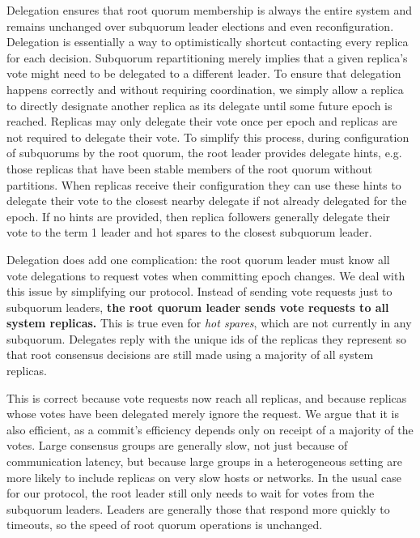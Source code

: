 \documentclass[11pt,conference]{IEEEtran}
\begin{document}
Delegation ensures that root quorum membership is always the entire
system and remains unchanged over subquorum leader elections and even
reconfiguration.
Delegation is essentially a way to optimistically shortcut contacting
every replica for each decision.
Subquorum repartitioning merely implies that a given replica's vote
might need to be delegated to a different leader.
To ensure that delegation happens correctly and without requiring
coordination, we simply allow a replica to directly designate another
replica as its delegate until some future epoch is reached.
Replicas may only delegate their vote once per epoch and replicas are
not required to delegate their vote.
To simplify this process, during configuration of subquorums by the
root quorum, the root leader provides delegate hints, e.g. those
replicas that have been stable members of the root quorum without
partitions.
When replicas receive their configuration they can use these hints
to delegate their vote to the closest nearby delegate if not already
delegated for the epoch.
If no hints are provided, then replica followers generally delegate
their vote to the term 1 leader and hot spares to the closest subquorum
leader.

Delegation does add one complication: the root quorum leader must
know all vote delegations to request votes when committing epoch
changes.
We deal with this issue by simplifying our protocol.
Instead of sending vote requests just to subquorum leaders,
\textbf{the root quorum leader sends vote requests to all system
replicas.}
This is true even for \emph{hot spares}, which are not currently
in any subquorum.
Delegates reply with the unique ids of the replicas they represent
so that root consensus decisions are still made using a majority of
all system replicas.

This is correct because vote requests now reach all replicas, and
because replicas whose votes have been delegated merely ignore the
request.
We argue that it is also efficient, as a commit's efficiency depends
only on receipt of a majority of the votes.
Large consensus groups are generally slow, not just because of
communication latency, but because large groups in a heterogeneous
setting are more likely to include replicas on very slow hosts or
networks.
In the usual case for our protocol, the root leader still only needs
to wait for votes from the subquorum leaders.
Leaders are generally those that respond more quickly to timeouts, so
the speed of root quorum operations is unchanged.

\end{document}
